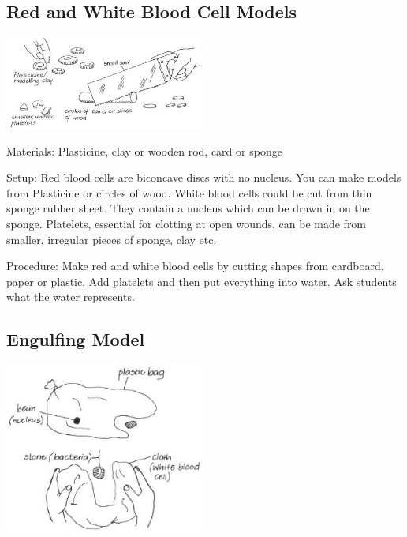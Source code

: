 \begin{multicols}{2}
\columnbreak

\subsection{Red and White Blood Cell Models}  %

\begin{center}
\includegraphics[width=0.49\textwidth]{./img/vso/red-white-model.jpg}
\end{center}

\begin{description*}
\item[Materials:]{Plasticine, clay or wooden rod, card or sponge}
\item[Setup:]{Red blood cells are biconcave discs with no nucleus. You can make
models from Plasticine or circles of wood. White blood cells could be
cut from thin sponge rubber sheet. They contain a nucleus which can
be drawn in on the sponge. Platelets, essential for clotting at open
wounds, can be made from smaller, irregular pieces of sponge, clay etc. }
\item[Procedure:]{Make red and white blood cells
by cutting shapes from cardboard,
paper or plastic.
Add platelets and then put
everything into water. Ask
students what the water
represents.}
\end{description*}

\subsection{Engulfing Model} %

\begin{center}
\includegraphics[width=0.49\textwidth]{./img/vso/engulfing.jpg}
\end{center}


\end{multicols}
